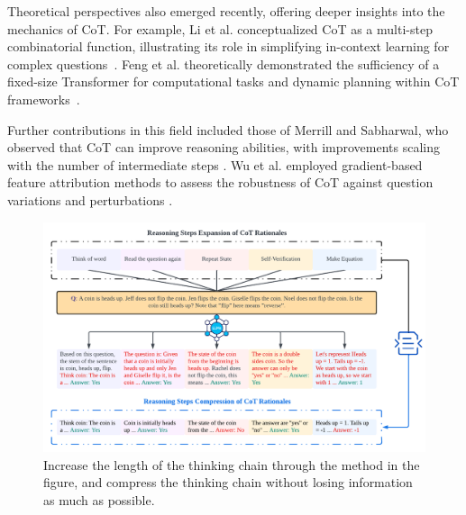 \documentclass[11pt]{article}
\begin{document}
Theoretical perspectives also emerged recently, offering deeper insights into the mechanics of CoT. For example, Li et al. conceptualized CoT as a multi-step combinatorial function, illustrating its role in simplifying in-context learning for complex questions~\cite{li2023dissecting}. Feng et al. theoretically demonstrated the sufficiency of a fixed-size Transformer for computational tasks and dynamic planning within CoT frameworks~\cite{fu2023complexitybased}.

Further contributions in this field included those of Merrill and Sabharwal, who observed that CoT can improve reasoning abilities, with improvements scaling with the number of intermediate steps \cite{merrill2023expressive}. Wu et al. employed gradient-based feature attribution methods to assess the robustness of CoT against question variations and perturbations \cite{wu2023analyzing}.

\begin{figure}[ht]
    \centering
    \includegraphics[width=1\linewidth]{intro.pdf}

    \caption{Increase the length of the thinking chain through the method in the figure, and compress the thinking chain without losing information as much as possible.}
    \label{fig:intro}

\end{figure}


\phantom{Invisible Text}
\vspace{-\baselineskip}
\end{document}
